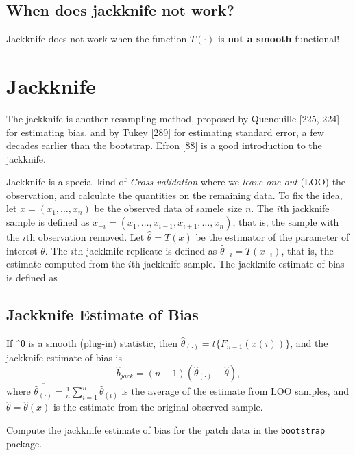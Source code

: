 \documentclass[
  letterpaper,
  DIV=11,
  numbers=noendperiod]{scrreprt}
\newenvironment{Shaded}{\begin{snugshade}}{\end{snugshade}}
\newcommand{\AttributeTok}[1]{\textcolor[rgb]{0.40,0.45,0.13}{#1}}
\newcommand{\FunctionTok}[1]{\textcolor[rgb]{0.28,0.35,0.67}{#1}}
\newcommand{\NormalTok}[1]{\textcolor[rgb]{0.00,0.23,0.31}{#1}}
\newcommand{\OtherTok}[1]{\textcolor[rgb]{0.00,0.23,0.31}{#1}}
\newcommand{\SpecialCharTok}[1]{\textcolor[rgb]{0.37,0.37,0.37}{#1}}
\newcommand{\StringTok}[1]{\textcolor[rgb]{0.13,0.47,0.30}{#1}}
\begin{document}
\subsection{When does jackknife not
work?}\label{when-does-jackknife-not-work}

Jackknife does not work when the function \(T(\cdot)\) is \textbf{not a
smooth} functional!

\section{Jackknife}\label{jackknife-1}

The jackknife is another resampling method, proposed by Quenouille
{[}225, 224{]} for estimating bias, and by Tukey {[}289{]} for
estimating standard error, a few decades earlier than the bootstrap.
Efron {[}88{]} is a good introduction to the jackknife.

Jackknife is a special kind of \emph{Cross-validation} where we
\emph{leave-one-out} (LOO) the observation, and calculate the quantities
on the remaining data. To fix the idea, let \(x=(x_1,\dots,x_n)\) be the
observed data of samele size \(n\). The \(i\)th jackknife sample is
defined as \(x_{-i}=(x_1,\dots,x_{i-1},x_{i+1},\dots,x_n)\), that is,
the sample with the \(i\)th observation removed. Let
\(\hat{\theta}=T(x)\) be the estimator of the parameter of interest
\(\theta\). The \(i\)th jackknife replicate is defined as
\(\hat{\theta}_{-i}=T(x_{-i})\), that is, the estimate computed from the
\(i\)th jackknife sample. The jackknife estimate of bias is defined as

\subsection{Jackknife Estimate of
Bias}\label{jackknife-estimate-of-bias}

If ˆθ is a smooth (plug-in) statistic, then
\(\hat{\theta}_{(\cdot)} = t\{F_{n−1}(x(i))\}\), and the jackknife
estimate of bias is \[
\hat{b}_{jack} = (n − 1)(\hat{\theta}_{(\cdot)} − \hat{\theta}), 
\] where
\(\overline{\hat{\theta}_{(\cdot)}}=\frac{1}{n} \sum_{i=1}^n \hat{\theta}_{(i)}\)
is the average of the estimate from LOO samples, and
\(\hat{\theta}=\hat{\theta}(x)\) is the estimate from the original
observed sample.

Compute the jackknife estimate of bias for the patch data in the
\texttt{bootstrap} package.

\begin{Shaded}
\end{Shaded}
\end{document}
